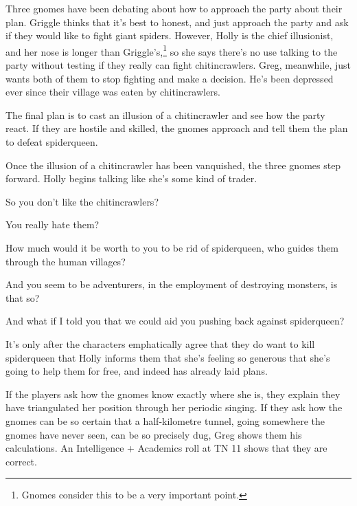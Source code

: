 \begin{multicols}{2}
\begin{boxtext}
\end{boxtext}

Three gnomes have been debating about how to approach the party about their plan.
Griggle thinks that it's best to honest, and just approach the party and ask if they would like to fight giant spiders.
However, Holly is the chief illusionist, and her nose is longer than Griggle's,\footnote{Gnomes consider this to be a very important point.} so she says there's no use talking to the party without testing if they really can fight chitincrawlers.
Greg, meanwhile, just wants both of them to stop fighting and make a decision.
He's been depressed ever since their village was eaten by chitincrawlers.

The final plan is to cast an illusion of a chitincrawler and see how the party react.  If they are hostile and skilled, the gnomes approach and tell them the plan to defeat \gls{spiderqueen}.

Once the illusion of a chitincrawler has been vanquished, the three gnomes step forward.
Holly begins talking like she's some kind of trader.

\columnbreak
\vfill\null

\begin{speechtext}

	So you don't like the chitincrawlers?

	You really hate them?

	How much would it be worth to you to be rid of \gls{spiderqueen}, who guides them through the human villages?

	And you seem to be adventurers, in the employment of destroying monsters, is that so?

	And what if I told you that we could aid you pushing back against \gls{spiderqueen}?

\end{speechtext}

It's only after the characters emphatically agree that they do want to kill \gls{spiderqueen} that Holly informs them that she's feeling so generous that she's going to help them for free, and indeed has already laid plans.

If the players ask how the gnomes know exactly where she is, they explain they have triangulated her position through her periodic singing.  If they ask how the gnomes can be so certain that a half-kilometre tunnel, going somewhere the gnomes have never seen, can be so precisely dug, Greg shows them his calculations.  An Intelligence + Academics roll at TN 11 shows that they are correct.


\end{multicols}
